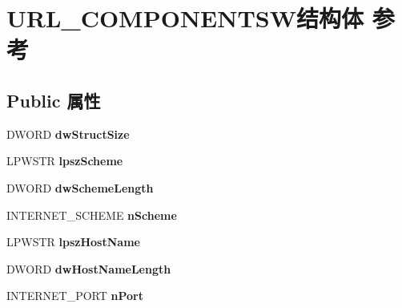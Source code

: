 \hypertarget{struct_u_r_l___c_o_m_p_o_n_e_n_t_s_w}{}\section{U\+R\+L\+\_\+\+C\+O\+M\+P\+O\+N\+E\+N\+T\+S\+W结构体 参考}
\label{struct_u_r_l___c_o_m_p_o_n_e_n_t_s_w}
\subsection*{Public 属性}
\begin{DoxyCompactItemize}
\item 
\mbox{\label{struct_u_r_l___c_o_m_p_o_n_e_n_t_s_w_a07105572ed3ec98ce46cc144215cf68d}} 
D\+W\+O\+RD {\bfseries dw\+Struct\+Size}
\item 
\mbox{\label{struct_u_r_l___c_o_m_p_o_n_e_n_t_s_w_abfdef7bf1568313b3b15f9fecd7e34fe}} 
L\+P\+W\+S\+TR {\bfseries lpsz\+Scheme}
\item 
\mbox{\label{struct_u_r_l___c_o_m_p_o_n_e_n_t_s_w_af968b06ec363ce288a45e06e903cd29e}} 
D\+W\+O\+RD {\bfseries dw\+Scheme\+Length}
\item 
\mbox{\label{struct_u_r_l___c_o_m_p_o_n_e_n_t_s_w_ab0968af260cda5233d4557a233e5bf32}} 
I\+N\+T\+E\+R\+N\+E\+T\+\_\+\+S\+C\+H\+E\+ME {\bfseries n\+Scheme}
\item 
\mbox{\label{struct_u_r_l___c_o_m_p_o_n_e_n_t_s_w_a72f9829072490cafd10fb810deba9c73}} 
L\+P\+W\+S\+TR {\bfseries lpsz\+Host\+Name}
\item 
\mbox{\label{struct_u_r_l___c_o_m_p_o_n_e_n_t_s_w_a97266cd7fc57048390b65cf5de4c3c3b}} 
D\+W\+O\+RD {\bfseries dw\+Host\+Name\+Length}
\item 
\mbox{\label{struct_u_r_l___c_o_m_p_o_n_e_n_t_s_w_af8bf1e254c294691f62cc51d33adde05}} 
I\+N\+T\+E\+R\+N\+E\+T\+\_\+\+P\+O\+RT {\bfseries n\+Port}
\item 
\mbox{\label{struct_u_r_l___c_o_m_p_o_n_e_n_t_s_w_ad036a328eaba0be95ac98dd5d53ee6a4}} 

\end{DoxyCompactItemize}
